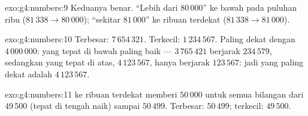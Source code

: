 \begin{solution}{exo:g4:numbers:9}
Keduanya benar. ``Lebih dari $80\,000$''  ke bawah pada
puluhan ribu ($81\,338 \to 80\,000$); ``sekitar $81\,000$''
 ke ribuan terdekat ($81\,338 \to 81\,000$).
\end{solution}

\begin{solution}{exo:g4:numbers:10}
Terbesar: $7\,654\,321$. Terkecil: $1\,234\,567$. Paling dekat
dengan $4\,000\,000$: yang tepat di bawah paling baik ---
$3\,765\,421$ berjarak $234\,579$, sedangkan yang tepat di atas,
$4\,123\,567$, hanya berjarak $123\,567$: jadi yang paling dekat adalah $4\,123\,567$.
\end{solution}

\begin{solution}{exo:g4:numbers:11}
 ke ribuan terdekat memberi $50\,000$ untuk semua bilangan
dari $49\,500$ (tepat di tengah  naik) sampai $50\,499$.
Terbesar: $50\,499$; terkecil: $49\,500$.

\end{solution}
